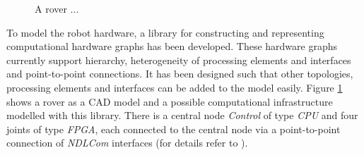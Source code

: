 \documentclass[a4paper,twocolumn]{esapub2005} %
\begin{document}
\begin{figure}[t]
    \centering
    \caption{A rover ...}
    \label{fig:rover_and_model}
\end{figure}
To model the robot hardware, a library for constructing and representing computational hardware graphs has been developed.
These hardware graphs currently support hierarchy, heterogeneity of processing elements and interfaces and point-to-point connections.
It has been designed such that other topologies, processing elements and interfaces can be added to the model easily.
Figure \ref{fig:rover_and_model} shows a rover as a CAD model and a possible computational infrastructure modelled with this library.
There is a central node \emph{Control} of type \emph{CPU} and four joints of type \emph{FPGA},
each connected to the central node via a point-to-point connection of \emph{NDLCom} interfaces (for details refer to \citep{2016_Zenzes}).
\end{document}
